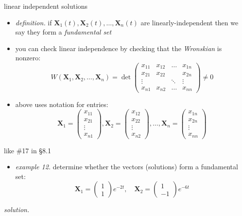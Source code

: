 \documentclass[urlcolor=blue,dvipsnames]{beamer}
\newcommand{\bX}{\mathbf{X}}
\begin{document}
\begin{frame}{linear independent solutions}

\begin{itemize}
\item \emph{definition.} if $\bX_1(t),\bX_2(t),\dots,\bX_n(t)$ are  linearly-independent then we say they form a \emph{fundamental set}
\item you can check linear independence by checking that the \emph{Wronskian} is nonzero:
    $$W\left(\bX_1,\bX_2,\dots,\bX_n\right) = \det \begin{pmatrix} x_{11} & x_{12} & \dots & x_{1n} \\ x_{21} & x_{22} &  & x_{2n} \\ \vdots & & \ddots & \vdots \\ x_{n1} & x_{n2} & \dots & x_{nn} \end{pmatrix} \ne 0$$
\item above uses notation for entries:
    $$\bX_1 = \begin{pmatrix} x_{11} \\ x_{21} \\ \vdots \\ x_{n1} \end{pmatrix}, \bX_2 = \begin{pmatrix} x_{12} \\ x_{22} \\ \vdots \\ x_{n2} \end{pmatrix}, \dots, \bX_n = \begin{pmatrix} x_{1n} \\ x_{2n} \\ \vdots \\ x_{nn} \end{pmatrix}$$
\end{itemize}
\end{frame}


\begin{frame}{like \#17 in \S8.1}

\begin{itemize}
\item \emph{example 12.}  determine whether the vectors (solutions) form a fundamental set:
    $$\bX_1 = \begin{pmatrix} 1 \\ 1 \end{pmatrix} e^{-2t}, \quad \bX_2 = \begin{pmatrix} 1 \\ -1 \end{pmatrix} e^{-6t}$$
\end{itemize}

\noindent \emph{solution.}

\vspace{40mm}
\end{frame}
\end{document}
